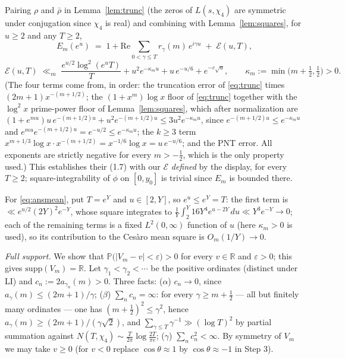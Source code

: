 Pairing $\rho$ and $\bar\rho$ in Lemma~\ref{lem:trunc} (the zeros of
$L(s,\chi_4)$ are symmetric under conjugation since $\chi_4$ is real)
and combining with Lemma~\ref{lem:squares}, for $u\ge2$ and any
$T\ge2$,
\[
E_m(e^u)\;=\;1+\mathrm{Re}\!\!\sum_{0<\gamma\le T}\!\! r_\gamma(m)\,
e^{i\gamma u}\;+\;\mathcal E(u,T),
\]
\[
\mathcal E(u,T)\;\ll_m\;
\frac{e^{u/2}\log^2(e^uT)}{T}
+u^2e^{-\kappa_m u}
+u\,e^{-u/6}
+e^{-c\sqrt{u}},
\qquad
\kappa_m:=\min\bigl(m+\tfrac12,\tfrac12\bigr)>0 .
\]
(The four terms come from, in order: the truncation error of
\eqref{eq:trunc} times $(2m+1)x^{-(m+1/2)}$; the $(1+x^m)\log x$ floor
of \eqref{eq:trunc} together with the $\log^2x$ prime-power floor of
Lemma~\ref{lem:squares}, which after normalization are
$(1+e^{mu})u\,e^{-(m+1/2)u}+u^2e^{-(m+1/2)u}\le3u^2e^{-\kappa_mu}$,
since $e^{-(m+1/2)u}\le e^{-\kappa_mu}$ and
$e^{mu}e^{-(m+1/2)u}=e^{-u/2}\le e^{-\kappa_mu}$; the $k\ge3$ term
$x^{m+1/3}\log x\cdot x^{-(m+1/2)}=x^{-1/6}\log x=u\,e^{-u/6}$; and
the PNT error. All exponents are strictly negative for every
$m>-\tfrac12$, which is the only property used.) This establishes their
(1.7) with our $\mathcal E$ \emph{defined} by the display, for every
$T\ge2$; square-integrability of $\phi$ on $[0,y_0]$ is trivial since
$E_m$ is bounded there.

For \eqref{eq:ansmean}, put $T=e^{Y}$ and $u\in[2,Y]$, so
$e^u\le e^Y=T$: the first term is
$\ll e^{u/2}(2Y)^2e^{-Y}$, whose square integrates to
$\frac1Y\int_2^Y 16Y^4e^{u-2Y}\,du\ll Y^3e^{-Y}\to0$; each of the
remaining terms is a fixed $L^2(0,\infty)$ function of $u$ (here
$\kappa_m>0$ is used), so its contribution to the Ces\`aro mean square
is $O_m(1/Y)\to0$.



\emph{Full support.} We show that
$\mathbb P\bigl(|V_m-v|<\varepsilon\bigr)>0$ for every $v\in\mathbb R$
and $\varepsilon>0$; this gives $\mathrm{supp}(V_m)=\mathbb R$. Let
$\gamma_1<\gamma_2<\cdots$ be the positive ordinates (distinct under
LI) and $c_n:=2a_{\gamma_n}(m)>0$. Three facts:
($\alpha$) $c_n\to0$, since $a_\gamma(m)\le(2m+1)/\gamma$;
($\beta$) $\sum_nc_n=\infty$: for every $\gamma\ge m+\tfrac12$ --- all
but finitely many ordinates --- one has
$(m+\tfrac12)^2\le\gamma^2$, hence
$a_\gamma(m)\ge(2m+1)/(\gamma\sqrt2)$, and
$\sum_{\gamma\le T}\gamma^{-1}\gg(\log T)^2$ by partial summation
against $N(T,\chi_4)\sim\frac{T}{2\pi}\log\frac{2T}{\pi e}$;
($\gamma$) $\sum_nc_n^2<\infty$. By symmetry of $V_m$ we may take
$v\ge0$ (for $v<0$ replace $\cos\theta\approx1$ by
$\cos\theta\approx-1$ in Step 3).

